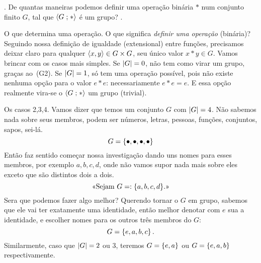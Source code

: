 \question.
De quantas maneiras podemos definir uma operação binária $\ast$ num conjunto
finito $G$, tal que $\langle{G}\mathrel{;}{\ast}\rangle$ é um grupo?
\spoiler.

\note O que determina uma operação.
O que significa \emph{definir uma operação} (binária)?
Seguindo nossa definição de igualdade (extensional) entre funções,
precisamos deixar claro para qualquer $\left<x,y\right>\in G\times G$,
seu único valor $x \ast y \in G$.
Vamos brincar com os casos mais simples.
Se $\left|G\right| = 0$, não tem como virar um grupo, graças ao~(G2).
Se $\left|G\right| = 1$, só tem uma operação possível, pois não existe
nenhuma opção para o valor $e \ast e$: necessariamente $e \ast e = e$.
E essa opção realmente vira-se o $\langle{G}\mathrel{;}{\ast}\rangle$ um grupo (trivial).

\note Os casos 2,3,4.
Vamos dizer que temos um conjunto $G$ com $\left|G\right| = 4$.
Não sabemos nada sobre seus membros, podem ser números, letras, pessoas,
funções, conjuntos, sapos, sei-lá.
$$
G = \left\{ \bullet, \bullet, \bullet, \bullet \right\}
$$
Então faz sentido começar nossa investigação dando uns nomes para
esses membros, por exemplo $a,b,c,d$, onde não vamos supor nada mais
sobre eles exceto que são distintos dois a dois.
$$
\text{<<Sejam $G\mathrel{=:}\left\{a,b,c,d\right\}$.>>}
$$
Sera que podemos fazer algo melhor?
Querendo tornar o $G$ em grupo, sabemos que ele vai ter exatamente uma
identidade, então melhor denotar com $e$ sua a identidade,
e escolher nomes para os outros três membros do $G$:
$$
G = \left\{e, a, b, c\right\}.
$$
Similarmente, caso que $\left|G\right| = 2$ ou $3$, teremos
$G = \left\{e, a\right\}$
ou
$G = \left\{e, a, b\right\}$
respectivamente.

